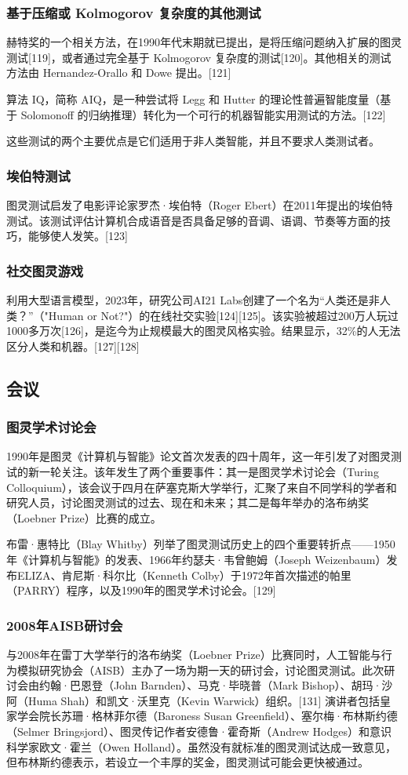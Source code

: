 \subsubsection{基于压缩或 Kolmogorov 复杂度的其他测试}
赫特奖的一个相关方法，在1990年代末期就已提出，是将压缩问题纳入扩展的图灵测试[119]，或者通过完全基于 Kolmogorov 复杂度的测试[120]。其他相关的测试方法由 Hernandez-Orallo 和 Dowe 提出。[121]

算法 IQ，简称 AIQ，是一种尝试将 Legg 和 Hutter 的理论性普遍智能度量（基于 Solomonoff 的归纳推理）转化为一个可行的机器智能实用测试的方法。[122]

这些测试的两个主要优点是它们适用于非人类智能，并且不要求人类测试者。
\subsubsection{埃伯特测试}
图灵测试启发了电影评论家罗杰·埃伯特（Roger Ebert）在2011年提出的埃伯特测试。该测试评估计算机合成语音是否具备足够的音调、语调、节奏等方面的技巧，能够使人发笑。[123]
\subsubsection{社交图灵游戏}
利用大型语言模型，2023年，研究公司AI21 Labs创建了一个名为“人类还是非人类？”（"Human or Not?"）的在线社交实验[124][125]。该实验被超过200万人玩过1000多万次[126]，是迄今为止规模最大的图灵风格实验。结果显示，32\%的人无法区分人类和机器。[127][128]
\subsection{会议}
\subsubsection{图灵学术讨论会}
1990年是图灵《计算机与智能》论文首次发表的四十周年，这一年引发了对图灵测试的新一轮关注。该年发生了两个重要事件：其一是图灵学术讨论会（Turing Colloquium），该会议于四月在萨塞克斯大学举行，汇聚了来自不同学科的学者和研究人员，讨论图灵测试的过去、现在和未来；其二是每年举办的洛布纳奖（Loebner Prize）比赛的成立。

布雷·惠特比（Blay Whitby）列举了图灵测试历史上的四个重要转折点——1950年《计算机与智能》的发表、1966年约瑟夫·韦曾鲍姆（Joseph Weizenbaum）发布ELIZA、肯尼斯·科尔比（Kenneth Colby）于1972年首次描述的帕里（PARRY）程序，以及1990年的图灵学术讨论会。[129]
\subsubsection{2008年AISB研讨会}
与2008年在雷丁大学举行的洛布纳奖（Loebner Prize）比赛同时，人工智能与行为模拟研究协会（AISB）主办了一场为期一天的研讨会，讨论图灵测试。此次研讨会由约翰·巴恩登（John Barnden）、马克·毕晓普（Mark Bishop）、胡玛·沙阿（Huma Shah）和凯文·沃里克（Kevin Warwick）组织。[131] 演讲者包括皇家学会院长苏珊·格林菲尔德（Baroness Susan Greenfield）、塞尔梅·布林斯约德（Selmer Bringsjord）、图灵传记作者安德鲁·霍奇斯（Andrew Hodges）和意识科学家欧文·霍兰（Owen Holland）。虽然没有就标准的图灵测试达成一致意见，但布林斯约德表示，若设立一个丰厚的奖金，图灵测试可能会更快被通过。
